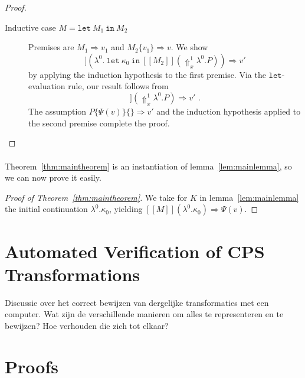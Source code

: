 \documentclass[a4paper,11pt,draft]{article}
\newcommand{\kw}[1]{\mathtt{#1}}
\begin{document}
\begin{proof}
\begin{description}
\item[\sffamily Inductive case $M = \kw{let} \: M_{1} \: \kw{in} \: M_{2}$]\hfill

  Premises are $M_{1} \Rightarrow v_{1}$ and $M_{2}\{v_{1}\} \Rightarrow v$.
  We show
  \begin{equation*}
    [\![M_{1}]\!]
    (\lambda^{0}. \: \kw{let} \: \kappa_{0} \: \kw{in} \: [\![M_{2}]\!]
    (\Uparrow_{x}^{1} \lambda^{0}.P)) \Rightarrow v'
  \end{equation*}
  by applying the induction hypothesis to the first premise. Via the
  $\kw{let}$-evaluation rule, our result follows from
  \begin{equation*}
    [\![M_{2}\{v_{1}\}]\!] (\Uparrow_{x}^{1} \lambda^{0}.P)
    \Rightarrow v' \text{ .}
  \end{equation*}
  The assumption $P\{\Psi(v)\}\{\} \Rightarrow v'$ and the induction hypothesis
  applied to the second premise complete the proof.\qedhere
\end{description}
\end{proof}

\paragraph{}

Theorem~\ref{thm:maintheorem} is an instantiation of
lemma~\ref{lem:mainlemma}, so we can now prove it easily.

\begin{proof}[Proof of Theorem~\ref{thm:maintheorem}]
We take for $K$ in lemma~\ref{lem:mainlemma} the initial continuation
$\lambda^{0}.\kappa_{0}$, yielding
$[\![M]\!] (\lambda^{0}.\kappa_{0}) \Rightarrow \Psi(v)$.
\end{proof}


\section{Automated Verification of CPS Transformations}\label{sec:automated}

Discussie over het correct bewijzen van dergelijke transformaties met een
computer. Wat zijn de verschillende manieren om alles te representeren en te
bewijzen? Hoe verhouden die zich tot elkaar?


\appendix


\section{Proofs}\label{sec:proofs}
\end{document}
